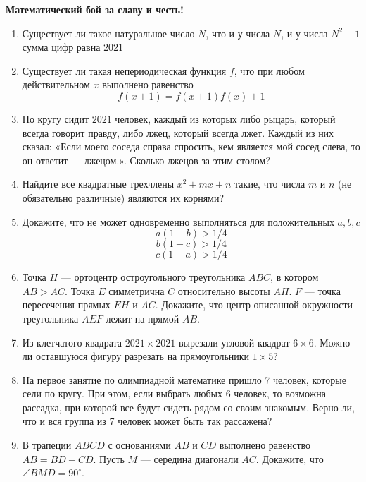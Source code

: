 \documentclass{article}
\begin{document}
\large
	

\begin{center}
\textbf{Математический бой за славу и честь!}
\end{center}

\begin{enumerate}

\item Существует ли такое натуральное число $N$, что и у числа $N$, и у числа $N^2 - 1$ сумма цифр равна $2021$

\item Существует ли такая непериодическая функция $f$, что при любом действительном $x$ выполнено равенство $$f (x + 1) = f (x + 1)f (x) + 1$$

\item По кругу сидит $2021$ человек, каждый из которых либо рыцарь, который всегда говорит правду, либо лжец, который всегда лжет. Каждый из них сказал: «Если моего соседа справа спросить, кем является мой сосед слева, то он ответит — лжецом.». Сколько лжецов за этим столом?

\item Найдите все квадратные трехчлены $x^2 + mx + n$ такие, что числа $m$ и $n$ (не обязательно различные) являются их корнями?

\item Докажите, что не может одновременно выполняться для положительных $a,b,c$
$$a(1-b)>1/4$$
$$b(1-c)>1/4 $$
$$c(1-a)>1/4$$

\item Точка $H$ — ортоцентр остроугольного треугольника $ABC$, в котором $AB > AC$. Точка $E$ симметрична $C$ относительно высоты $AH$. $F$ — точка пересечения прямых $EH$ и $AC$. Докажите, что центр описанной окружности треугольника $AEF$ лежит на прямой $AB$.

\item Из клетчатого квадрата $2021 \times 2021$ вырезали угловой квадрат $6 \times 6$. Можно ли оставшуюся фигуру разрезать на прямоугольники $1 \times 5$?

\item На первое занятие по олимпиадной математике пришло 7 человек, которые сели по кругу. При этом, если выбрать любых 6 человек, то возможна рассадка, при которой все будут сидеть рядом со своим знакомым. Верно ли, что и вся группа из 7 человек может быть так рассажена? 

\item В трапеции $ABCD$ с основаниями $AB$ и $CD$ выполнено равенство $AB = BD + CD$. Пусть $M$ — середина диагонали $AC$. Докажите, что $\angle BMD = 90^\circ$.



\end{enumerate}
\end{document}
